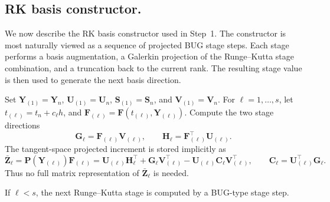 \documentclass[preprint,runningheads]{svjour3}
\newcommand\bfC{{\mathbf C}}
\newcommand\bfF{{\mathbf F}}
\newcommand\bfG{{\mathbf G}}
\newcommand\bfH{{\mathbf H}}
\newcommand\bfP{{\mathbf P}}
\newcommand\bfS{{\mathbf S}}
\newcommand\bfU{{\mathbf U}}
\newcommand\bfV{{\mathbf V}}
\newcommand\bfY{{\mathbf Y}}
\newcommand\bfZ{{\mathbf Z}}
\begin{document}
\subsection{RK basis constructor.}\label{sec_rk_basis_constr_bugp}
We now describe the RK basis constructor used in Step~1. The constructor is most
naturally viewed as a sequence of projected BUG stage steps. Each stage performs
a basis augmentation, a Galerkin projection of the Runge--Kutta stage
combination, and a truncation back to the current rank. The resulting stage
value is then used to generate the next basis direction.

Set
$
    \bfY_{(1)}=\bfY_n
  $, $
    \bfU_{(1)}=\bfU_n  $, $
    \bfS_{(1)}=\bfS_n  $, and $
    \bfV_{(1)}=\bfV_n 
$.
For $\ell=1,\ldots,s$, let
$
    t_{(\ell)} = t_n+c_\ell h $, and $
    \bfF_{(\ell)}
    =
    \bfF(t_{(\ell)},\bfY_{(\ell)}).
$
Compute the two stage directions
\[
    \bfG_\ell=\bfF_{(\ell)}\bfV_{(\ell)},
    \qquad
    \bfH_\ell=\bfF_{(\ell)}^\top\bfU_{(\ell)} .
\]
The tangent-space projected increment is stored implicitly as
\begin{equation}
\label{eq:projected-stage-increment-factorized}
    \bar\bfZ_\ell
    =
    \bfP(\bfY_{(\ell)})\bfF_{(\ell)}
    =
    \bfU_{(\ell)}\bfH_\ell^\top
    +
    \bfG_\ell\bfV_{(\ell)}^\top
    -
    \bfU_{(\ell)}\bfC_\ell\bfV_{(\ell)}^\top,
    \qquad
    \bfC_\ell=\bfU_{(\ell)}^\top\bfG_\ell .
\end{equation}
Thus no full matrix representation of $\bar\bfZ_\ell$ is needed.

If $\ell<s$, the next Runge--Kutta stage is computed by a BUG-type stage step.
\end{document}

